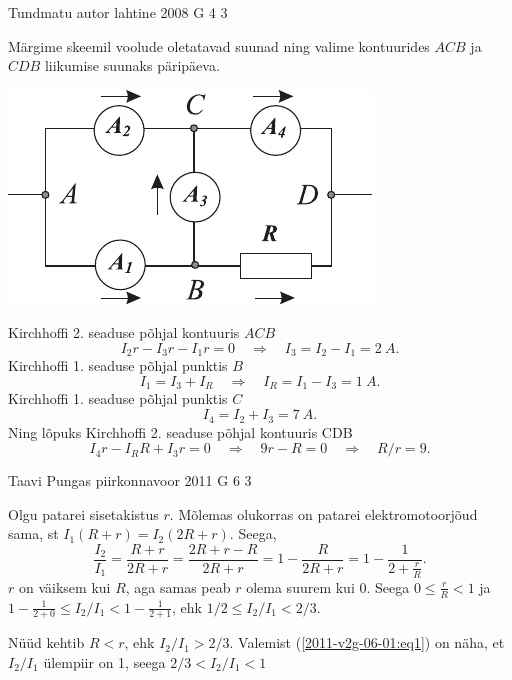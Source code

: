 \documentclass[11pt, twoside]{article}
\begin{document}
{%
{Tundmatu autor} %
{lahtine} %
{2008} %
{G 4} %
{3} %
{

\ifSolution
Märgime skeemil voolude oletatavad suunad ning valime kontuurides $ACB$ ja $CDB$
liikumise suunaks päripäeva.

\begin{center}
	\includegraphics[width=0.6\linewidth]{2008-lahg-04-lah}
\end{center}

Kirchhoffi 2. seaduse põhjal kontuuris $ACB$
\[
I_2r - I_3r - I_1r = 0 \quad\Rightarrow\quad I_3 = I_2 - I_1 = \SI{2}{A}.
\]
Kirchhoffi 1. seaduse põhjal punktis $B$
\[
I_1 = I_3 + I_R \quad\Rightarrow\quad I_R = I_1 - I_3 = \SI{1}{A}.
\]
Kirchhoffi 1. seaduse põhjal punktis $C$
\[
I_4 = I_2 + I_3 = \SI{7}{A}.
\]
Ning lõpuks Kirchhoffi 2. seaduse põhjal kontuuris CDB
\[
I_4r - I_RR + I_3r = 0 \quad\Rightarrow\quad 9r - R = 0 \quad\Rightarrow\quad R/r = \num{9}.
\]
\fi
}

{Taavi Pungas} %
{piirkonnavoor} %
{2011} %
{G 6} %
{3} %
{

\ifSolution
Olgu patarei sisetakistus $r$. Mõlemas olukorras on patarei elektromotoorjõud sama, st $I_1(R + r) = I_2(2R + r)$. Seega,
\begin{equation}\label{2011-v2g-06-01:eq1}
\frac{I_2}{I_1} = \frac{R + r}{2R + r} = \frac{2R + r - R}{2R + r} = 1 - \frac{R}{2R + r} = 1 - \frac{1}{2 + \frac{r}{R}}.
\end{equation}
\osa $r$ on väiksem kui $R$, aga samas peab $r$ olema suurem kui \num{0}. Seega $0 \leq \frac{r}{R} < 1$ ja $1 - \frac{1}{2 + 0} \leq I_2/I_1 < 1 - \frac{1}{2 + 1}$, ehk $1 / 2 \leq I_{2} / I_{1}<2 / 3$.

\osa Nüüd kehtib $R < r$, ehk $I_2/I_1 > 2/3$. Valemist (\ref{2011-v2g-06-01:eq1}) on näha, et $I_2/I_1$ ülempiir on \num{1}, seega $2/3 < I_2/I_1 < 1$
\fi
}

}
\end{document}
